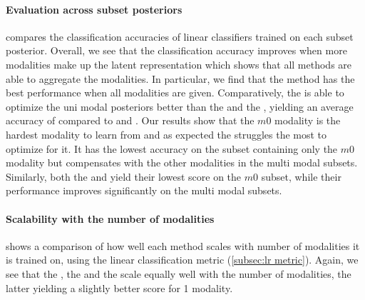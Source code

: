 \paragraph{Evaluation across subset posteriors}
 compares the classification accuracies of linear classifiers trained on each subset posterior.
Overall, we see that the classification accuracy improves when more modalities make up the latent representation which shows that all methods are able to aggregate the modalities.
In particular, we find that the  method has the best performance when all modalities are given.
Comparatively, the  is able to optimize the uni modal posteriors better than the  and the , yielding an average accuracy of  compared to  and .
Our results show that the $m0$ modality is the hardest modality to learn from and as expected the  struggles the most to optimize for it.
It has the lowest accuracy on the subset containing only the $m0$ modality but compensates with the other modalities in the multi modal subsets.
Similarly, both the  and  yield their lowest score on the $m0$ subset, while their performance improves significantly on the multi modal subsets.


\paragraph{Scalability with the number of modalities}
 shows a comparison of how well each method scales with number of modalities it is trained on, using the linear classification metric (\cref{subsec:lr metric}).
Again, we see that the , the  and the  scale equally well with the number of modalities, the latter yielding a slightly better score for 1 modality.

\begin{sansmath}
\end{sansmath}

